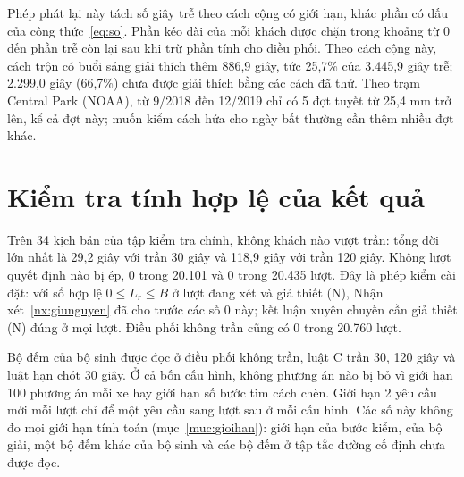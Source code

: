 Phép phát lại này tách số giây trễ theo cách cộng có giới hạn, khác phần có dấu của công thức~\eqref{eq:so}. Phần kéo
dài của mỗi khách được chặn trong khoảng từ 0 đến phần trễ còn lại sau khi trừ phần tính cho điều phối. Theo cách cộng
này, cách trộn
có buổi sáng giải thích thêm 886,9 giây, tức 25,7\% của 3.445,9 giây trễ; 2.299,0 giây (66,7\%) chưa được giải thích
bằng các cách đã thử. Theo trạm Central Park (NOAA), từ 9/2018 đến 12/2019 chỉ có 5 đợt tuyết từ 25,4 mm trở lên, kể
cả đợt này; muốn kiểm cách hứa cho ngày bất thường cần thêm nhiều đợt khác.

\section{Kiểm tra tính hợp lệ của kết quả}
\label{muc:c4-hople}

Trên 34 kịch bản của tập kiểm tra chính, không khách nào vượt trần: tổng dời lớn nhất là 29,2 giây với trần 30 giây và
118,9 giây với trần 120 giây. Không lượt quyết định nào bị ép, 0 trong 20.101 và 0 trong 20.435 lượt. Đây là phép kiểm cài
đặt: với sổ hợp lệ $0 \le L_r \le B$ ở lượt đang xét và giả thiết (N), Nhận xét~\ref{nx:giunguyen} đã cho trước các
số 0 này; kết luận xuyên chuyến cần giả thiết (N) đúng ở mọi lượt. Điều phối không trần cũng có 0 trong 20.760 lượt.

Bộ đếm của bộ sinh được đọc ở điều phối không trần, luật C trần 30, 120 giây và luật hạn chót 30 giây. Ở cả bốn cấu
hình, không phương án nào bị bỏ vì giới hạn 100 phương án mỗi xe hay giới hạn số bước tìm cách chèn. Giới hạn 2 yêu cầu
mới mỗi lượt chỉ để một yêu cầu sang lượt sau ở mỗi cấu hình. Các số này không đo mọi giới hạn tính toán (mục~\ref{muc:gioihan}): giới hạn
của bước kiểm, của bộ giải, một bộ đếm khác của bộ sinh và các bộ đếm ở tập tắc đường cố định chưa được đọc.

